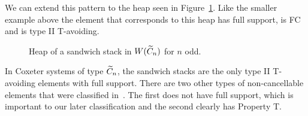 We can extend this pattern to the heap seen in Figure~\ref{fig:stacksandstack}. Like the smaller example above the element that corresponds to this heap has full support, is FC and is type II T-avoiding. 

\begin{figure}[h!] \centering
{}	
\caption{Heap of a sandwich stack in $W(\widetilde{C}_n)$ for $n$ odd.}\label{fig:stacksandstack}
\end{figure}

\begin{remark}\label{rem:noncancel}
	 In Coxeter systems of type $\widetilde{C}_n$, the sandwich stacks are the only type II T-avoiding elements with full support. There are two other types of non-cancellable elements that were classified in~\cite{Ernst2010}. The first does not have full support, which is important to our later classification and the second clearly has Property T.
\end{remark}



